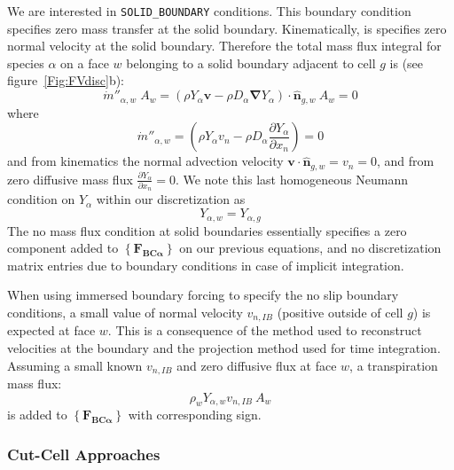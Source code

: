 \documentclass[12pt]{article}
\begin{document}
We are interested in \texttt{SOLID\_BOUNDARY} conditions. This boundary condition specifies zero mass transfer at the solid boundary. Kinematically, is specifies zero normal velocity at the solid boundary. Therefore the total mass flux integral for species $\alpha$ on a face $w$ belonging to a solid boundary adjacent to cell $g$ is (see figure~\ref{Fig:FVdisc}b):
%
\begin{equation}
    \dot{m}''_{\alpha,w} \; A_w = \left( \rho Y_\alpha \mathbf{v} - \rho D_\alpha \boldsymbol{\nabla} Y_\alpha \right) \cdot \hat{\mathbf{n}}_{g,w} \: A_w = 0 \label{eq:fvsolidbc}
\end{equation}
%
where
\begin{equation}
    \dot{m}''_{\alpha,w} = \left( \rho Y_\alpha v_n - \rho D_\alpha \frac{\partial Y_\alpha}{\partial x_n} \right) = 0 \label{eq:fvsolidbc2}
\end{equation}
and from kinematics the normal advection velocity $\mathbf{v} \cdot \hat{\mathbf{n}}_{g,w}=v_n=0$, and from zero diffusive mass flux $\frac{\partial Y_\alpha}{\partial x_n}=0$. We note this last homogeneous Neumann condition on $Y_\alpha$ within our discretization as
%
\begin{equation}
   Y_{\alpha,w} = Y_{\alpha,g}
\end{equation}
%
The no mass flux condition at solid boundaries essentially specifies a zero component added to $\left\{ \mathbf{F_{BC \alpha}} \right\}$ on our previous equations, and no discretization matrix entries due to boundary conditions in case of implicit integration.

When using immersed boundary forcing to specify the no slip boundary conditions, a small value of normal velocity $v_{n,IB}$ (positive outside of cell $g$) is expected at face $w$. This is a consequence of the method used to reconstruct velocities at the boundary and the projection method used for time integration. Assuming a small known $v_{n,IB}$ and zero diffusive flux at face $w$, a transpiration mass flux:
%
\begin{equation}
    \rho_w Y_{\alpha,w} v_{n,IB}  \: A_w
\end{equation}
%
is added to $\left\{ \mathbf{F_{BC \alpha}} \right\}$ with corresponding sign.





\subsubsection{Cut-Cell Approaches} \label{sec:cc}
\end{document}
